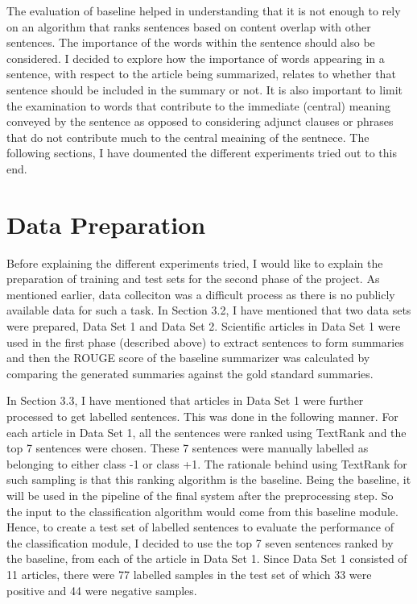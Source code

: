 The evaluation of baseline helped in understanding that it is not enough to rely on an algorithm that ranks sentences based on content overlap with other sentences.
The importance of the words within the sentence should also be considered.
I decided to explore how the importance of words appearing in a sentence, with respect to the article being summarized, relates to whether that sentence should be included in the summary or not.
It is also important to limit the examination to words that contribute to the immediate (central) meaning conveyed by the sentence as opposed to considering adjunct clauses or phrases that do not contribute much to the central meaining of the sentnece.
The following sections, I have doumented the different experiments tried out to this end.

\section{Data Preparation}
Before explaining the different experiments tried, I would like to explain the preparation of training and test sets for the second phase of the project.
As mentioned earlier, data colleciton was a difficult process as there is no publicly available data for such a task.
In Section 3.2, I have mentioned that two data sets were prepared, Data Set 1 and Data Set 2.
Scientific articles in Data Set 1 were used in the first phase (described above) to extract sentences to form summaries and then the ROUGE score of the baseline summarizer was calculated by comparing the generated summaries against the gold standard summaries.

In Section 3.3, I have mentioned that articles in Data Set 1 were further processed to get labelled sentences.
This was done in the following manner.
For each article in Data Set 1, all the sentences were ranked using TextRank and the top 7 sentences were chosen.
These 7 sentences were manually labelled as belonging to either class -1 or class +1.
The rationale behind using TextRank for such sampling is that this ranking algorithm is the baseline.
Being the baseline, it will be used in the pipeline of the final system after the preprocessing step.
So the input to the classification algorithm would come from this baseline module.
Hence, to create a test set of labelled sentences to evaluate the performance of the classification module, I decided to use the top 7 seven sentences ranked by the baseline, from each of the article in Data Set 1.
Since Data Set 1 consisted of 11 articles, there were 77 labelled samples in the test set of which 33 were positive and 44 were negative samples.

